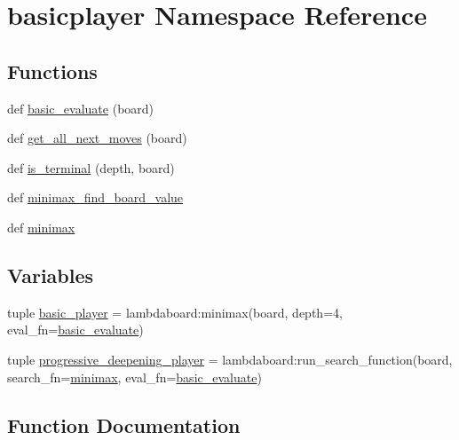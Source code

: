 \hypertarget{namespacebasicplayer}{}\section{basicplayer Namespace Reference}
\label{namespacebasicplayer}
\subsection*{Functions}
\begin{DoxyCompactItemize}
\item 
def \hyperlink{namespacebasicplayer_a2962f523af7aeaa39d58be2cdf3d6d6d}{basic\+\_\+evaluate} (board)
\item 
def \hyperlink{namespacebasicplayer_acad964e2f439ab4e2220fea5c0574728}{get\+\_\+all\+\_\+next\+\_\+moves} (board)
\item 
def \hyperlink{namespacebasicplayer_ae276eac2da00c9d44c78c0c9ac1452b0}{is\+\_\+terminal} (depth, board)
\item 
def \hyperlink{namespacebasicplayer_a62f7c238ff1fe79bcb2c56d5897a4864}{minimax\+\_\+find\+\_\+board\+\_\+value}
\item 
def \hyperlink{namespacebasicplayer_a030bbbbdb3c20ccc2984ee862cce6e0f}{minimax}
\end{DoxyCompactItemize}
\subsection*{Variables}
\begin{DoxyCompactItemize}
\item 
tuple \hyperlink{namespacebasicplayer_af4714dbbe203205344968d715419e8dd}{basic\+\_\+player} = lambdaboard\+:minimax(board, depth=4, eval\+\_\+fn=\hyperlink{namespacebasicplayer_a2962f523af7aeaa39d58be2cdf3d6d6d}{basic\+\_\+evaluate})
\item 
tuple \hyperlink{namespacebasicplayer_a54f0471ccb2744141a3ace5f56e46161}{progressive\+\_\+deepening\+\_\+player} = lambdaboard\+:run\+\_\+search\+\_\+function(board, search\+\_\+fn=\hyperlink{namespacebasicplayer_a030bbbbdb3c20ccc2984ee862cce6e0f}{minimax}, eval\+\_\+fn=\hyperlink{namespacebasicplayer_a2962f523af7aeaa39d58be2cdf3d6d6d}{basic\+\_\+evaluate})
\end{DoxyCompactItemize}


\subsection{Function Documentation}
\hypertarget{namespacebasicplayer_a2962f523af7aeaa39d58be2cdf3d6d6d}{}
